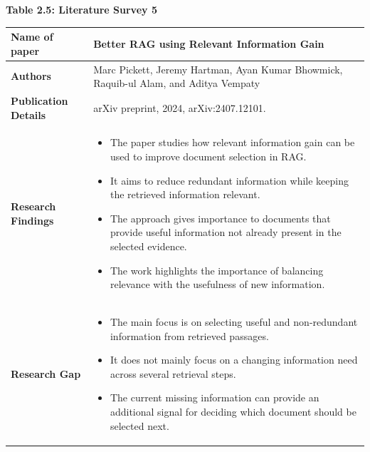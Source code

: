 \documentclass[12pt,a4paper]{report}
\begin{document}
\clearpage

\begin{center}\textbf{Table 2.5: Literature Survey 5}\end{center}\label{tab:lit5}
\begin{longtable}{|p{1.25in}|p{5.15in}|}
\hline

\textbf{Name of paper} & Better RAG using Relevant Information Gain \cite{pickett2024better} \\ \hline

\textbf{Authors} & Marc Pickett, Jeremy Hartman, Ayan Kumar Bhowmick, Raquib-ul Alam, and Aditya Vempaty \\ \hline

\textbf{Publication Details} & arXiv preprint, 2024, arXiv:2407.12101. \\ \hline

\textbf{Research Findings} &
\begin{itemize}[leftmargin=0.18in,itemsep=0.05in,topsep=0pt,parsep=0pt]
\item The paper studies how relevant information gain can be used to improve document selection in RAG.
\item It aims to reduce redundant information while keeping the retrieved information relevant.
\item The approach gives importance to documents that provide useful information not already present in the selected evidence.
\item The work highlights the importance of balancing relevance with the usefulness of new information.
\end{itemize} \\ \hline

\textbf{Research Gap} &
\begin{itemize}[leftmargin=0.18in,itemsep=0.05in,topsep=0pt,parsep=0pt]
\item The main focus is on selecting useful and non-redundant information from retrieved passages.
\item It does not mainly focus on a changing information need across several retrieval steps.
\item The current missing information can provide an additional signal for deciding which document should be selected next.
\end{itemize} \\ \hline


\end{longtable}
\end{document}
